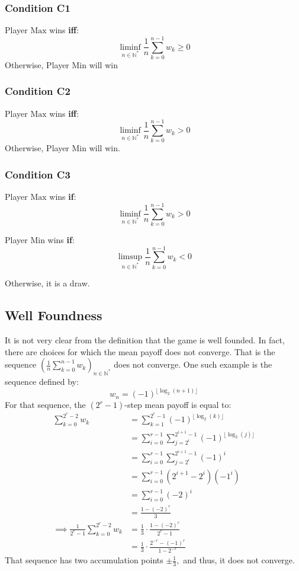 \subsubsection{Condition C1}
Player $\text{Max}$ wins \textbf{iff}:
$$
\liminf_{n\in\mathbb{N}^*} \frac{1}{n}\sum_{k=0}^{n-1} w_k \ge 0
$$ 
Otherwise, Player $\text{Min}$ will win

\subsubsection{Condition C2}
Player $\text{Max}$ wins \textbf{iff}:
$$
\liminf_{n\in\mathbb{N}^*} \frac{1}{n}\sum_{k=0}^{n-1} w_k > 0
$$ 
Otherwise, Player $\text{Min}$ will win.
\subsubsection{Condition C3}
Player $\text{Max}$ wins \textbf{if}:
$$
\liminf_{n\in\mathbb{N}^*} \frac{1}{n}\sum_{k=0}^{n-1} w_k > 0
$$ 

Player $\text{Min}$ wins \textbf{if}:
$$
\limsup_{n\in\mathbb{N}^*} \frac{1}{n}\sum_{k=0}^{n-1} w_k < 0
$$ 

Otherwise, it is a draw.

\subsection{Well Foundness}
It is not very clear from the definition that the game is well founded. \newline
In fact, there are choices for which the mean payoff does not converge. That is the sequence $\left(\frac{1}{n}\sum_{k=0}^{n-1} w_k \right)_{n\in\mathbb{N}^*}$ does not converge. \newline One such example is the sequence defined by:
$$
w_n=(-1)^{\lfloor  \log_2 (n+1)\rfloor}
$$
For that sequence, the $(2^r-1)$-step mean payoff is equal to:
\begin{align*}
	\sum_{k=0}^{2^r-2} w_k &= 	\sum_{k=1}^{2^r-1}(-1)^{\lfloor  \log_2 (k)\rfloor} \\
	&= \sum_{i=0}^{r-1}\sum_{j=2^{i}}^{2^{i+1}-1}(-1)^{\lfloor  \log_2 (j)\rfloor} \\
	&=\sum_{i=0}^{r-1}\sum_{j=2^{i}}^{2^{i+1}-1}(-1)^i \\
	&=\sum_{i=0}^{r-1}(2^{i+1}-2^i)(-1^i) \\
	&=\sum_{i=0}^{r-1}(-2)^i \\ 
	&= \frac{1-(-2)^r}{3} \\
	\implies \frac{1}{2^r-1}\sum_{k=0}^{2^r-2} w_k  &= \frac{1}{3} \cdot \frac{1-(-2)^r}{2^r-1} \\
&= \frac{1}{3} \cdot \frac{2^{-r}-(-1)^r}{1-2^{-r}}
\end{align*}
That sequence has two accumulation points $\pm \frac{1}{3},$ and thus, it does not converge.


